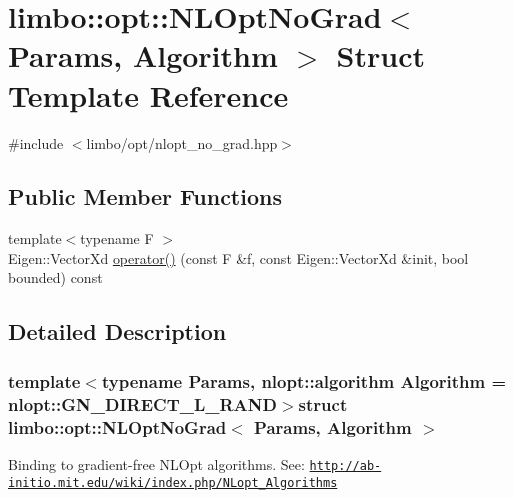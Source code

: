 \hypertarget{structlimbo_1_1opt_1_1_n_l_opt_no_grad}{}\section{limbo\+:\+:opt\+:\+:N\+L\+Opt\+No\+Grad$<$ Params, Algorithm $>$ Struct Template Reference}
\label{structlimbo_1_1opt_1_1_n_l_opt_no_grad}


{\ttfamily \#include $<$limbo/opt/nlopt\+\_\+no\+\_\+grad.\+hpp$>$}

\subsection*{Public Member Functions}
\begin{DoxyCompactItemize}
\item 
{\footnotesize template$<$typename F $>$ }\\Eigen\+::\+Vector\+Xd \hyperlink{structlimbo_1_1opt_1_1_n_l_opt_no_grad_a23cdeb4f9c63e44bd7fb4dbf8d8553d7}{operator()} (const F \&f, const Eigen\+::\+Vector\+Xd \&init, bool bounded) const 
\end{DoxyCompactItemize}


\subsection{Detailed Description}
\subsubsection*{template$<$typename Params, nlopt\+::algorithm Algorithm = nlopt\+::\+G\+N\+\_\+\+D\+I\+R\+E\+C\+T\+\_\+\+L\+\_\+\+R\+A\+N\+D$>$struct limbo\+::opt\+::\+N\+L\+Opt\+No\+Grad$<$ Params, Algorithm $>$}

Binding to gradient-\/free N\+L\+Opt algorithms. See\+: \href{http://ab-initio.mit.edu/wiki/index.php/NLopt_Algorithms}{\tt http\+://ab-\/initio.\+mit.\+edu/wiki/index.\+php/\+N\+Lopt\+\_\+\+Algorithms}

